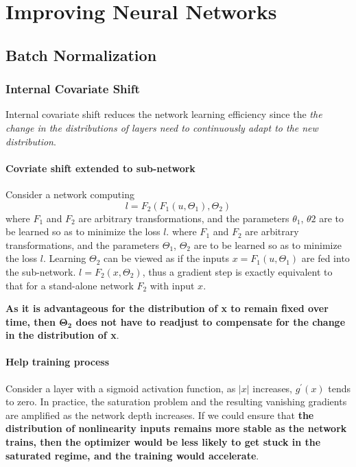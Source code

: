 \documentclass[a3paper, 12pt]{book} %
\begin{document}
\chapter{Improving Neural Networks}
\section{Batch Normalization}
\subsection{Internal Covariate Shift}
Internal covariate shift reduces the network learning efficiency since the \emph{the change in the distributions of layers need to continuously adapt to the new distribution}.

\subsubsection{Covriate shift extended to sub-network}
Consider a network computing 
$$l=F_2{(F_1{(u,\Theta_1)},\Theta_2)}$$
where $F_1$ and $F_2$ are arbitrary transformations, and the
parameters $\theta_1$, $\theta2$ are to be learned so as to minimize
the loss $l$.
where $F_1$ and $F_2$ are arbitrary transformations, and the parameters $\Theta_1$, $\Theta_2$ are to be learned so as to minimize the loss $l$. Learning $\Theta_2$ can be viewed as if the inputs $x=F_1{(u,\Theta_1)}$ are fed into the sub-network. $l=F_2{(x, \Theta_2)}$, thus a gradient step is exactly equivalent to that for a stand-alone network $F_2$ with input $x$. 

\textbf{As it is advantageous for the distribution of x to remain fixed over time, then $\mathbf{\Theta_2}$ does not have to readjust to compensate for the change in the distribution of x}.

\subsubsection{Help training process}
Consider a layer with a sigmoid activation function, as $|x|$ increases, $g^{'}{(x)}$ tends to zero. In practice, the saturation problem and the resulting vanishing gradients are amplified as the network depth increases. If we could ensure that \textbf{the distribution of nonlinearity inputs remains more stable as the network trains, then the optimizer would be less likely to get stuck in the saturated regime, and the training would accelerate}.
\end{document}
